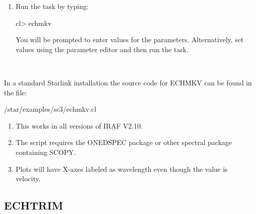 \documentclass[twoside,11pt]{starlink}
\begin{document}
\begin{description}
\begin{enumerate}
\begin{terminalv}
   on> task echmkv=home$echmkv.cl
\end{terminalv}

\item Or, in your login.cl or loginuser.cl place the following
      before the `keep':

\begin{terminalv}
   task echmkv=home$echmkv.cl
\end{terminalv}

\item Run the task by typing:

\begin{terminalv}
   cl> echmkv
\end{terminalv}

      You will be prompted
      to enter values for the parameters. Alternatively, set values
      using the parameter editor and then run the task.
\end{enumerate}

\item [\textbf{Source code:}] \mbox{} \\
\begin{latexonly}
In a standard Starlink installation the source code for ECHMKV can be found
in the file:
\begin{terminalv}
   /star/examples/sc3/echmkv.cl
\end{terminalv}
\end{latexonly}



\item [\textbf{Notes:}] \mbox{}
\begin{enumerate}
\item This works in all versions of IRAF V2.10.

\item The script requires the ONEDSPEC package or other spectral
      package containing SCOPY.

\item Plots will have X-axes labeled as wavelength even though the
      value is velocity.
\end{enumerate}

\end{description}

\newpage
\subsection{\label{se_echtrim}ECHTRIM}
\end{document}
